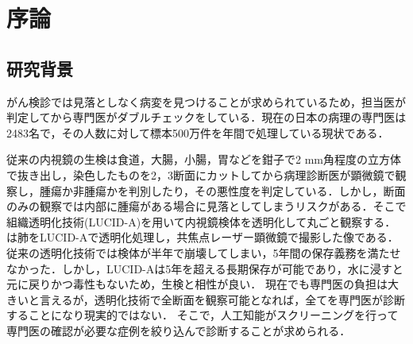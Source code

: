 \chapter{序論}
\label{chap_intro}

\section{研究背景}
がん検診では見落としなく病変を見つけることが求められているため，担当医が判定してから専門医がダブルチェックをしている．現在の日本の病理の専門医は2483名\cite{pathology}で，その人数に対して標本500万件を年間で処理している現状である．

従来の内視鏡の生検は食道，大腸，小腸，胃などを鉗子で2 mm角程度の立方体で抜き出し，染色したものを2，3断面にカットしてから病理診断医が顕微鏡で観察し，腫瘍か非腫瘍かを判別したり，その悪性度を判定している．しかし，断面のみの観察では内部に腫瘍がある場合に見落としてしまうリスクがある．そこで組織透明化技術(LUCID-A)\cite{sekitani2016ultraflexible}を用いて内視鏡検体を透明化して丸ごと観察する．
は肺をLUCID-Aで透明化処理し，共焦点レーザー顕微鏡で撮影した像である．
従来の透明化技術では検体が半年で崩壊してしまい，5年間の保存義務を満たせなかった．しかし，LUCID-Aは5年を超える長期保存が可能であり，水に浸すと元に戻りかつ毒性もないため，生検と相性が良い．
現在でも専門医の負担は大きいと言えるが，透明化技術で全断面を観察可能となれば，全てを専門医が診断することになり現実的ではない．
そこで，人工知能がスクリーニングを行って専門医の確認が必要な症例を絞り込んで診断することが求められる．

